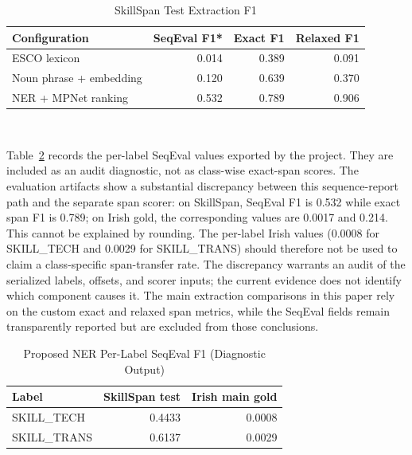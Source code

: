 \documentclass[conference]{IEEEtran}
\begin{document}
\begin{table}[!t]
\caption{SkillSpan Test Extraction F1}
\label{tab:skillspan}
\centering
\small
\begin{tabular}{p{2.5cm}rrr}
\toprule
Configuration & SeqEval F1* & Exact F1 & Relaxed F1 \\
\midrule
ESCO lexicon & 0.014 & 0.389 & 0.091 \\
Noun phrase + embedding & 0.120 & 0.639 & 0.370 \\
NER + MPNet ranking & 0.532 & 0.789 & 0.906 \\
\bottomrule
\end{tabular}
\\[1mm]
\par{}
\end{table}

Table~\ref{tab:class-f1} records the per-label SeqEval values exported by the project. They are included as an audit diagnostic, not as class-wise exact-span scores. The evaluation artifacts show a substantial discrepancy between this sequence-report path and the separate span scorer: on SkillSpan, SeqEval F1 is 0.532 while exact span F1 is 0.789; on Irish gold, the corresponding values are 0.0017 and 0.214. This cannot be explained by rounding. The per-label Irish values (0.0008 for \textsf{SKILL\_TECH} and 0.0029 for \textsf{SKILL\_TRANS}) should therefore not be used to claim a class-specific span-transfer rate. The discrepancy warrants an audit of the serialized labels, offsets, and scorer inputs; the current evidence does not identify which component causes it. The main extraction comparisons in this paper rely on the custom exact and relaxed span metrics, while the SeqEval fields remain transparently reported but are excluded from those conclusions.

\begin{table}[!t]
\caption{Proposed NER Per-Label SeqEval F1 (Diagnostic Output)}
\label{tab:class-f1}
\centering
\small
\begin{tabular}{lrr}
\toprule
Label & SkillSpan test & Irish main gold \\
\midrule
\textsf{SKILL\_TECH} & 0.4433 & 0.0008 \\
\textsf{SKILL\_TRANS} & 0.6137 & 0.0029 \\
\bottomrule
\end{tabular}
\\[1mm]
\par\vspace{1mm}{\footnotesize Source: per-label SeqEval report fields in the final extraction results; these are not class-wise exact-span F1 scores.}
\end{table}
\end{document}
